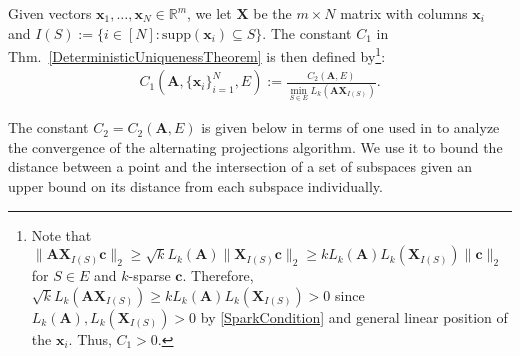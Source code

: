 \documentclass[9pt,twocolumn]{pnas-new}
\begin{document}
Given vectors $\mathbf{x}_1, \ldots, \mathbf{x}_N \in \mathbb{R}^m$, we let $\mathbf{X}$ be the $m \times N$ matrix with columns $\mathbf{x}_i$ and $I(S) := \{i \in [N]: \text{supp}(\mathbf{x}_i) \subseteq S\}$. The constant $C_1$ in Thm.~\ref{DeterministicUniquenessTheorem} is then defined by\footnote{Note that $\|\mathbf{AX}_{I(S)}\mathbf{c}\|_2 \geq \sqrt{k} L_k(\mathbf{A})\|\mathbf{X}_{I(S)}\mathbf{c}\|_2 \geq k L_k(\mathbf{A}) L_k(\mathbf{X}_{I(S)})\|\mathbf{c}\|_2$ for $S \in E$ and $k$-sparse $\mathbf{c}$. Therefore, $\sqrt{k} L_k(\mathbf{AX}_{I(S)}) \geq k L_k(\mathbf{A}) L_k(\mathbf{X}_{I(S)}) > 0$ since $L_k(\mathbf{A}), L_k(\mathbf{X}_{I(S)}) > 0$ by \eqref{SparkCondition} and general linear position of the $\mathbf{x}_i$.  Thus, $C_1 > 0$.  }:
\begin{align}\label{Cdef1}
C_1(\mathbf{A}, \{\mathbf{x}_i\}_{i=1}^N, E) := \frac{ C_2(\mathbf{A}, E) } { \min_{S \in E} L_k(\mathbf{AX}_{I(S)}) }.
\end{align}

The constant $C_2 = C_2(\mathbf{A}, E)$ is given below in terms of one used in \cite{Deutsch12} to analyze the convergence of the alternating projections algorithm.
We use it to bound the distance between a point and the intersection of a set of subspaces given an upper bound on its distance from each subspace individually.
\end{document}
